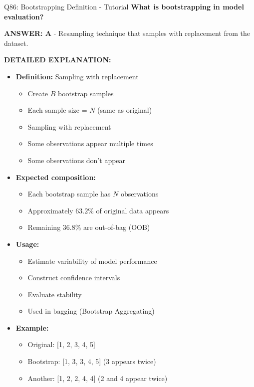 \documentclass[8pt]{beamer}
\begin{document}
	\begin{frame}{Q86: Bootstrapping Definition - Tutorial}
		\fontsize{6.5}{7.5}\selectfont
		\textbf{What is bootstrapping in model evaluation?}
		
		\vspace{0.05cm}
		\textcolor{myblue}{\textbf{ANSWER: A}} - Resampling technique that samples with replacement from the dataset.
		
		\vspace{0.05cm}
		\textbf{DETAILED EXPLANATION:}
		\begin{itemize}
			\item \textbf{Definition:} Sampling with replacement
			\begin{itemize}
				\item Create $B$ bootstrap samples
				\item Each sample size = $N$ (same as original)
				\item Sampling with replacement
				\item Some observations appear multiple times
				\item Some observations don't appear
			\end{itemize}
			\item \textbf{Expected composition:}
			\begin{itemize}
				\item Each bootstrap sample has $N$ observations
				\item Approximately $63.2\%$ of original data appears
				\item Remaining $36.8\%$ are out-of-bag (OOB)
			\end{itemize}
			\item \textbf{Usage:}
			\begin{itemize}
				\item Estimate variability of model performance
				\item Construct confidence intervals
				\item Evaluate stability
				\item Used in bagging (Bootstrap Aggregating)
			\end{itemize}
			\item \textbf{Example:}
			\begin{itemize}
				\item Original: [1, 2, 3, 4, 5]
				\item Bootstrap: [1, 3, 3, 4, 5] (3 appears twice)
				\item Another: [1, 2, 2, 4, 4] (2 and 4 appear twice)
			\end{itemize}
		\end{itemize}
		

\end{frame}
\end{document}
